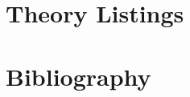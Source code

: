 \appendix

\vfill
\section{Theory Listings}
{
\let\Section\subsection
\let\Subsection\subsubsection
\def\subsection#1{\Subsection*{#1}}
\def\section#1{\Section{#1}\label{ariscat}}

\def\section#1{\Section{#1}\label{syllog1}}

\def\section#1{\Section{#1}\label{syllog2}}

\def\section#1{\Section{#1}\label{syllog2}}

\def\section#1{\Section{#1}\label{modsyllog}}

\def\section#1{\Section{#1}\label{syllmetap}}

\def\section#1{\Section{#1}\label{gccon}}


}  %

\pagebreak

\section*{Bibliography}\label{BIBLIOGRAPHY}

{\def\section*#1{\ignore{#1}}
\raggedright


} %

{
{\small\printindex}}



